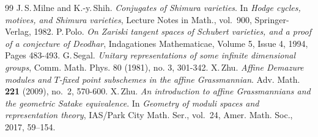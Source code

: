 \documentclass[a4paper, 12pt]{amsart}
\theoremstyle{definition}
\begin{document}
\begin{thebibliography}{99}
 J.\,S.\,Milne and K.-y.\,Shih. {\it Conjugates of Shimura varieties}. In {\it Hodge cycles, motives, and Shimura varieties}, Lecture Notes in Math., vol.~900, Springer-Verlag, 1982.
 P.\,Polo. {\it On Zariski tangent spaces of Schubert varieties, and a proof of a conjecture of Deodhar}, Indagationes Mathematicae, Volume 5, Issue 4, 1994, Pages 483-493.
G.\,Segal. {\it Unitary representations of some infinite dimensional groups}, Comm. Math. Phys. 80 (1981), no. 3, 301-342.
 X.\,Zhu.
{\it Affine Demazure modules and $T$-fixed point subschemes in the affine Grassmannian}. Adv. Math. {\bf 221} (2009), no.~2, 570-600.
 X.\,Zhu.
{\it An introduction to affine Grassmannians and the geometric Satake equivalence}.
In {\it Geometry of moduli spaces and representation theory}, IAS/Park City Math. Ser., vol.~24, Amer. Math. Soc., 2017, 59--154.

\end{thebibliography}  
\end{document}
